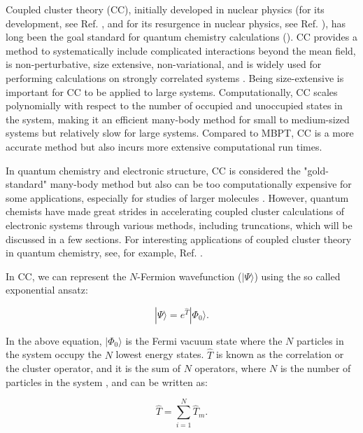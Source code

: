 Coupled cluster theory (CC), initially developed in nuclear physics (for its development, see Ref. \cite{Ref153, Ref152}, and for its resurgence in nuclear physics, see Ref. \cite{Ref147, Ref68, Ref16, Ref154, Ref148}), has long been the goal standard for quantum chemistry calculations (\cite{Ref149}). CC provides a method to systematically include complicated interactions beyond the mean field, is non-perturbative, size extensive, non-variational, and is widely used for performing calculations on strongly correlated systems \cite{Ref8}. Being size-extensive is important for CC to be applied to large systems. Computationally, CC scales polynomially with respect to the number of occupied and unoccupied states in the system, making it an efficient many-body method for small to medium-sized systems but relatively slow for large systems.  Compared to MBPT, CC is a more accurate method but also incurs more extensive computational run times.

In quantum chemistry and electronic structure, CC is considered the "gold-standard" many-body method but also can be too computationally expensive for some applications, especially for studies of larger molecules \cite{Ref7}. However, quantum chemists have made great strides in accelerating coupled cluster calculations of electronic systems through various methods, including truncations, which will be discussed in a few sections. For interesting applications of coupled cluster theory in quantum chemistry, see, for example, Ref. \cite{Ref140, Ref141, Ref149, Ref142,Ref143,Ref145,Ref150,Ref155,Ref7,Ref67,Ref72,Ref74}.

In CC, we can represent the $N$-Fermion wavefunction ($|\Psi\rangle$) using the so called exponential ansatz:

\begin{equation} \label{cc_ansatz}
    |\Psi \rangle = e^{\hat{T}} |\Phi_0 \rangle.
\end{equation}

In the above equation, $|\Phi_0\rangle$ is the Fermi vacuum state where the $N$ particles in the system occupy the $N$ lowest energy states. $\hat{T}$ is known as the correlation or the cluster operator, and it is the sum of $N$ operators, where $N$ is the number of particles in the system \cite{Ref8, Ref7}, and can be written as:

\begin{equation} \label{cluster}
    \hat{T} = \sum_{i=1}^N \hat{T}_m.
\end{equation}

